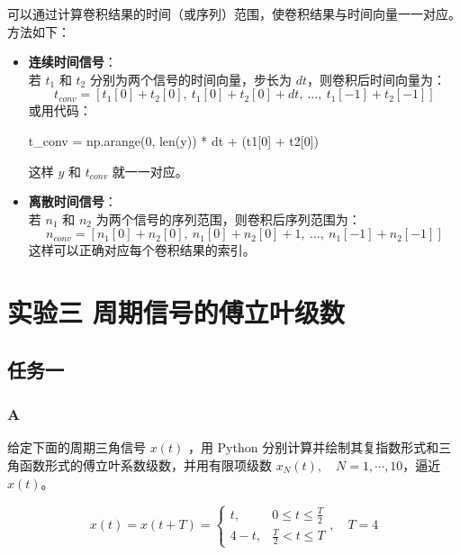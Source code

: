 \documentclass[12pt,a4paper,UTF8]{article}
\newenvironment{Shaded}{}{}
\newcommand{\DecValTok}[1]{\textcolor[rgb]{0.25,0.63,0.44}{{#1}}}
\newcommand{\NormalTok}[1]{{#1}}
\newcommand{\OperatorTok}[1]{\textcolor[rgb]{0.40,0.40,0.40}{{#1}}}
\newcommand{\BuiltInTok}[1]{{#1}}
\begin{document}
可以通过计算卷积结果的时间（或序列）范围，使卷积结果与时间向量一一对应。方法如下：

\begin{itemize}
\item
  \textbf{连续时间信号}：\\
  若 \(t_1\) 和 \(t_2\) 分别为两个信号的时间向量，步长为
  \(dt\)，则卷积后时间向量为： \[
  t_{conv} = [t_1[0] + t_2[0],\ t_1[0] + t_2[0] + dt,\ \ldots,\ t_1[-1] + t_2[-1]]
  \] 或用代码：

\begin{Shaded}
\begin{Highlighting}[]
\NormalTok{t\_conv }\OperatorTok{=}\NormalTok{ np.arange(}\DecValTok{0}\NormalTok{, }\BuiltInTok{len}\NormalTok{(y)) }\OperatorTok{*}\NormalTok{ dt }\OperatorTok{+}\NormalTok{ (t1[}\DecValTok{0}\NormalTok{] }\OperatorTok{+}\NormalTok{ t2[}\DecValTok{0}\NormalTok{])}
\end{Highlighting}
\end{Shaded}

  这样 \(y\) 和 \(t_{conv}\) 就一一对应。
\item
  \textbf{离散时间信号}：\\
  若 \(n_1\) 和 \(n_2\) 为两个信号的序列范围，则卷积后序列范围为： \[
  n_{conv} = [n_1[0] + n_2[0],\ n_1[0] + n_2[0] + 1,\ \ldots,\ n_1[-1] + n_2[-1]]
  \] 这样可以正确对应每个卷积结果的索引。
\end{itemize}

    \section{实验三
周期信号的傅立叶级数}\label{ux5b9eux9a8cux4e09-ux5468ux671fux4fe1ux53f7ux7684ux5085ux7acbux53f6ux7ea7ux6570}

\subsection{任务一}\label{ux4efbux52a1ux4e00}

\subsubsection{A}\label{a}

给定下面的周期三角信号 \(x(t)\) ，用 Python
分别计算并绘制其复指数形式和三角函数形式的傅立叶系数级数，并用有限项级数
\(x_N(t), \quad N = 1, \cdots, 10\)，逼近 \(x(t)\)。

\[
x(t) = x(t + T) = \begin{cases}
t, & 0 \le t \le \frac{T}{2} \\
4 - t, & \frac{T}{2} < t \le T
\end{cases}, \quad T = 4
\]
\end{document}
